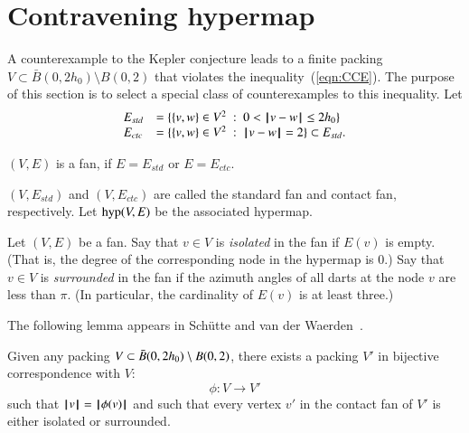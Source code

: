 \section{Contravening hypermap}

%
A counterexample to the Kepler conjecture leads to a finite packing $V\subset \bar B(0,2h_0)\setminus B(0,2)$ that violates the inequality~(\ref{eqn:CCE}).
 The purpose of this section is to select a special class of counterexamples to this inequality.
Let
\begin{equation}\label{eqn:fan-edge}
\begin{array}{lll}
 E_{std} &= \{\{v,w\}\in V^2\ :\  0 < {\hskip0.1em|\hskip-0.15em|\hskip0.1em}v - w{\hskip0.1em|\hskip-0.15em|\hskip0.1em}\le 2{h_0} \}\\
 E_{ctc} &= \{\{v,w\}\in V^2\ :\  {\hskip0.1em|\hskip-0.15em|\hskip0.1em}v - w{\hskip0.1em|\hskip-0.15em|\hskip0.1em}= 2 \}\subset E_{std}.
\end{array}
\end{equation}

\begin{lemma}
$(V,E)$ is a fan, if $E=E_{std}$ or $E=E_{ctc}$.
\end{lemma}
$(V,E_{std})$ and $(V,E_{ctc})$ are called the standard fan and contact fan, respectively.
Let ${\operatorname{hyp}}(V,E)$ be the associated hypermap.
%
%
%
%
%
%
%

\begin{definition}
Let $(V,E)$ be a fan.
Say that $v\in V$ is {\it isolated} in the fan if $E(v)$ is empty.
(That is, the degree of the corresponding node in the hypermap is $0$.) Say that $v\in V$ is {\it surrounded} in the fan if the azimuth angles of all darts at the node $v$ are less than $\pi$.  (In particular, the cardinality of $E(v)$ is at least three.)
\end{definition}
%
%
%
%
%
%

The following lemma appears in Sch\"utte and van der Waerden~\cite{vanderWaerden:1951}.

\begin{lemma}
Given any packing $V\subset \bar B(0,2{h_0})\setminus B(0,2)$,
there exists a  packing $V'$ 
in bijective correspondence with $V$:
$$
\phi:V\to V'
$$
such that ${{\hskip0.1em|\hskip-0.15em|\hskip0.1em}v{\hskip0.1em|\hskip-0.15em|\hskip0.1em}} = {{\hskip0.1em|\hskip-0.15em|\hskip0.1em}\phi(v){\hskip0.1em|\hskip-0.15em|\hskip0.1em}}$ and
such that every vertex $v'$ in the contact fan of $V'$
is either isolated or surrounded.
\end{lemma}
%
%
%

